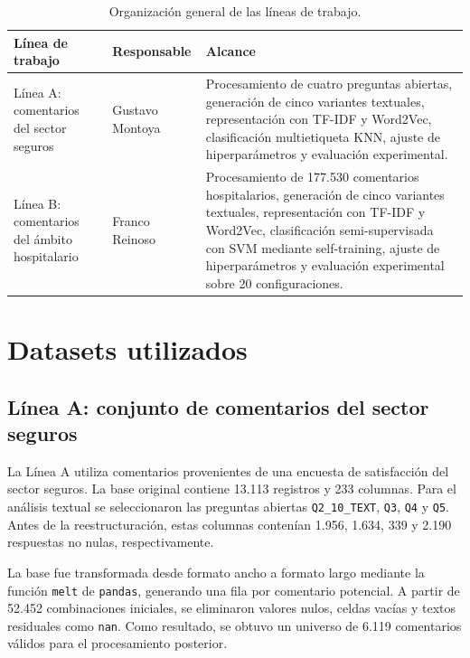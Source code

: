 \documentclass[12pt,a4paper]{article}
\newcommand{\code}[1]{\nolinkurl{#1}}
\begin{document}
\begin{table}[htbp]
\centering
\caption{Organización general de las líneas de trabajo.}
\label{tab:organizacion_lineas}
\small
\begin{tabularx}{\textwidth}{@{}P{3.1cm}P{3.4cm}Y@{}}
\toprule
\textbf{Línea de trabajo} & \textbf{Responsable} & \textbf{Alcance} \\
\midrule
Línea A: comentarios del sector seguros & Gustavo Montoya & Procesamiento de cuatro preguntas abiertas, generación de cinco variantes textuales, representación con TF-IDF y Word2Vec, clasificación multietiqueta KNN, ajuste de hiperparámetros y evaluación experimental. \\
\addlinespace
Línea B: comentarios del ámbito hospitalario & Franco Reinoso & Procesamiento de 177.530 comentarios hospitalarios, generación de cinco variantes textuales, representación con TF-IDF y Word2Vec, clasificación semi-supervisada con SVM mediante self-training, ajuste de hiperparámetros y evaluación experimental sobre 20 configuraciones. \\
\bottomrule
\end{tabularx}
\end{table}
\FloatBarrier

\section{Datasets utilizados}

\subsection{Línea A: conjunto de comentarios del sector seguros}

La Línea A utiliza comentarios provenientes de una encuesta de satisfacción del sector seguros. La base original contiene 13.113 registros y 233 columnas. Para el análisis textual se seleccionaron las preguntas abiertas \code{Q2\_10\_TEXT}, \code{Q3}, \code{Q4} y \code{Q5}. Antes de la reestructuración, estas columnas contenían 1.956, 1.634, 339 y 2.190 respuestas no nulas, respectivamente.

La base fue transformada desde formato ancho a formato largo mediante la función \code{melt} de \code{pandas}, generando una fila por comentario potencial. A partir de 52.452 combinaciones iniciales, se eliminaron valores nulos, celdas vacías y textos residuales como \code{nan}. Como resultado, se obtuvo un universo de 6.119 comentarios válidos para el procesamiento posterior.
\end{document}
